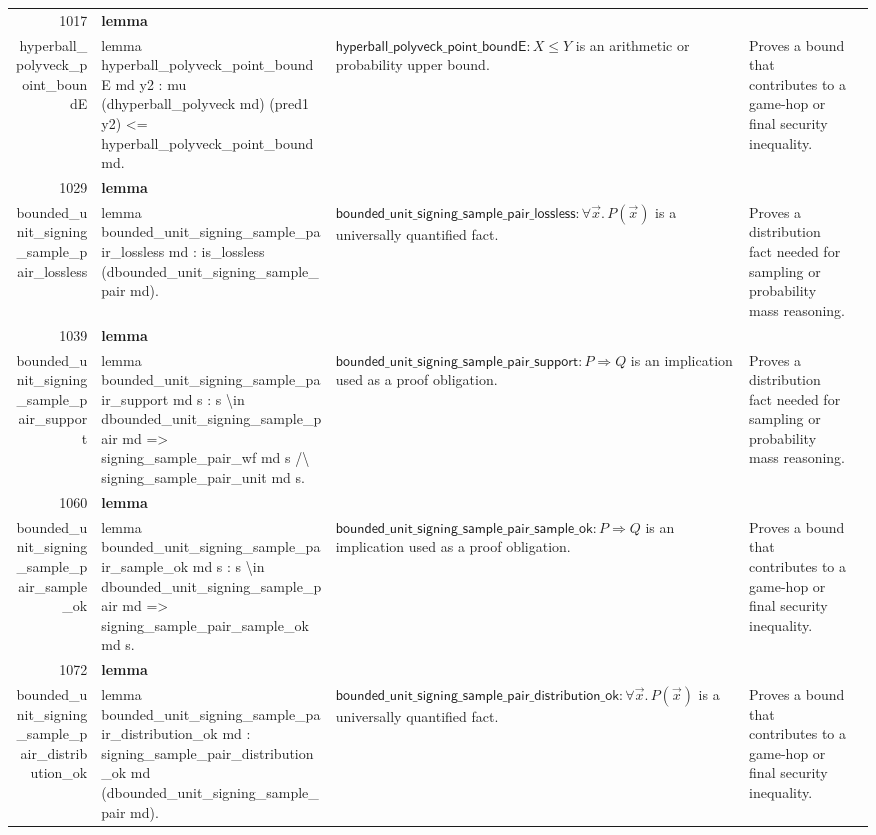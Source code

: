\documentclass[10pt]{article}
\newcommand{\ec}[1]{\begingroup\ttfamily\scriptsize #1\endgroup}
\begin{document}
\begin{longtable}{r L{0.17\textwidth} L{0.26\textwidth} L{0.27\textwidth} L{0.20\textwidth}}
1017 & \textbf{lemma}\\\ec{hyperball\_polyveck\_point\_boundE} & \ec{lemma hyperball\_polyveck\_point\_boundE md y2 : mu (dhyperball\_polyveck md) (pred1 y2) <= hyperball\_polyveck\_point\_bound md.} & \(\mathsf{hyperball\_polyveck\_point\_boundE} : X \le Y\) is an arithmetic or probability upper bound. & Proves a bound that contributes to a game-hop or final security inequality. \\
1029 & \textbf{lemma}\\\ec{bounded\_unit\_signing\_sample\_pair\_lossless} & \ec{lemma bounded\_unit\_signing\_sample\_pair\_lossless md : is\_lossless (dbounded\_unit\_signing\_sample\_pair md).} & \(\mathsf{bounded\_unit\_signing\_sample\_pair\_lossless} : \forall \vec{x}.\, P(\vec{x})\) is a universally quantified fact. & Proves a distribution fact needed for sampling or probability mass reasoning. \\
1039 & \textbf{lemma}\\\ec{bounded\_unit\_signing\_sample\_pair\_support} & \ec{lemma bounded\_unit\_signing\_sample\_pair\_support md s : s \textbackslash{}in dbounded\_unit\_signing\_sample\_pair md => signing\_sample\_pair\_wf md s /\textbackslash{} signing\_sample\_pair\_unit md s.} & \(\mathsf{bounded\_unit\_signing\_sample\_pair\_support} : P \Rightarrow Q\) is an implication used as a proof obligation. & Proves a distribution fact needed for sampling or probability mass reasoning. \\
1060 & \textbf{lemma}\\\ec{bounded\_unit\_signing\_sample\_pair\_sample\_ok} & \ec{lemma bounded\_unit\_signing\_sample\_pair\_sample\_ok md s : s \textbackslash{}in dbounded\_unit\_signing\_sample\_pair md => signing\_sample\_pair\_sample\_ok md s.} & \(\mathsf{bounded\_unit\_signing\_sample\_pair\_sample\_ok} : P \Rightarrow Q\) is an implication used as a proof obligation. & Proves a bound that contributes to a game-hop or final security inequality. \\
1072 & \textbf{lemma}\\\ec{bounded\_unit\_signing\_sample\_pair\_distribution\_ok} & \ec{lemma bounded\_unit\_signing\_sample\_pair\_distribution\_ok md : signing\_sample\_pair\_distribution\_ok md (dbounded\_unit\_signing\_sample\_pair md).} & \(\mathsf{bounded\_unit\_signing\_sample\_pair\_distribution\_ok} : \forall \vec{x}.\, P(\vec{x})\) is a universally quantified fact. & Proves a bound that contributes to a game-hop or final security inequality. \\

\end{longtable}
\end{document}
